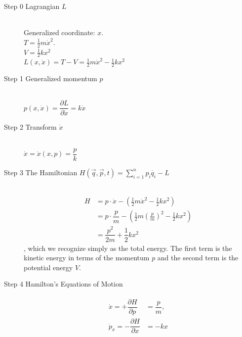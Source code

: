 \begin{description}
\item[Step 0 \quad Lagrangian $L$] \ \\[0.5cm]
Generalized coordinate: $x$. \\[0.2cm]
$T = \frac{1}{2} m \dot{x}^2.$ \\[0.2cm]
$V = \frac{1}{2} k x^2$ \\[0.2cm]
$L(x, \dot{x}) = T - V = \frac{1}{2} m \dot{x}^2 - \frac{1}{2} k x^2$

\item[Step 1 \quad Generalized momentum $p$] \ \\[0.2cm]
$p(x,\dot{x}) = \dfrac{\partial L}{\partial \dot{x}} = k \dot{x}$

\item[Step 2 \quad Transform $\dot{x}$] \ \\[0.5cm]
$\dot{x} = \dot{x}(x, p) = \dfrac{p}{k}$

\item[Step 3 \quad The Hamiltonian $H(\vec{q}, \vec{p}, t) = \sum\limits_{i=1}^n p_i \dot{q_i} - L$] \ \\
\begin{align}
\nonumber H &= p \cdot \dot{x} - \left(\frac{1}{2} m \dot{x}^2 - \frac{1}{2} k x^2\right) \\
\nonumber  &= p \cdot \dfrac{p}{m} - \left(\frac{1}{2} m \left(\frac{p}{m}\right)^2 - \frac{1}{2} k x^2\right) \\
&= \dfrac{p^2}{2m} + \dfrac{1}{2}k x^2
\end{align}
, which we recognize simply as the total energy. The first term is the kinetic energy in terms of the momentum $p$ and the second term is the potential energy $V$.

\item[Step 4 \quad Hamilton's Equations of Motion]
\begin{align}
\begin{split}
\label{eq:ho-eom}
\dot{x} = +\dfrac{\partial H}{\partial p} &= \dfrac{p}{m} ,
\\[0.2cm]
\dot{p}_x = -\dfrac{\partial H}{\partial x} &= - k x
\end{split}
\end{align}
\end{description}

